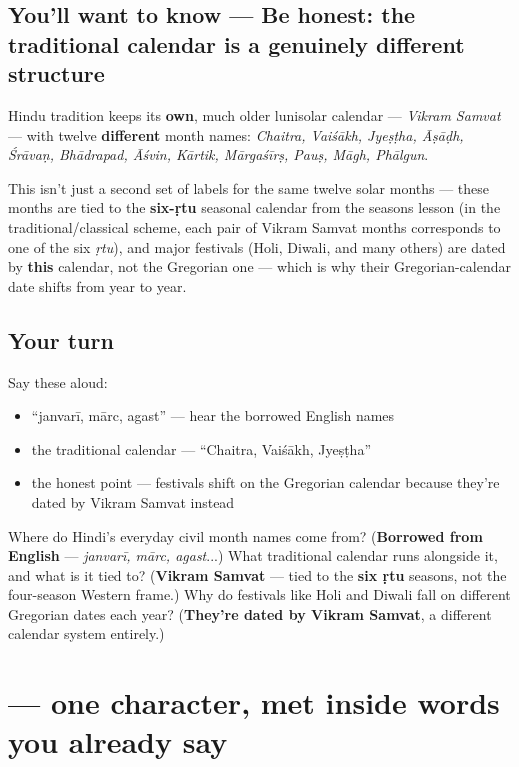 \subsection*{You'll want to know — Be honest: the traditional calendar is a genuinely different structure}
Hindu tradition keeps its \textbf{own}, much older lunisolar calendar — \emph{Vikram Samvat} — with twelve \textbf{different} month names: \emph{Chaitra, Vaiśākh, Jyeṣṭha, Āṣāḍh, Śrāvaṇ, Bhādrapad, Āśvin, Kārtik, Mārgaśīrṣ, Pauṣ, Māgh, Phālgun}.

This isn't just a second set of labels for the same twelve solar months — these months are tied to the \textbf{six-ṛtu} seasonal calendar from the seasons lesson (in the traditional/classical scheme, each pair of Vikram Samvat months corresponds to one of the six \emph{ṛtu}), and major festivals (Holi, Diwali, and many others) are dated by \textbf{this} calendar, not the Gregorian one — which is why their Gregorian-calendar date shifts from year to year.

\subsection*{Your turn}
Say these aloud:

\begin{itemize}
\raggedright
  \item \textquotedblleft{}janvarī, mārc, agast\textquotedblright{} — hear the borrowed English names
  \item the traditional calendar — \textquotedblleft{}Chaitra, Vaiśākh, Jyeṣṭha\textquotedblright{}
  \item the honest point — festivals shift on the Gregorian calendar because they're dated by Vikram Samvat instead
\end{itemize}

\begin{tcolorbox}[breakable,colback=teal!4,colframe=teal!35!black,title={Before you move on}]
Where do Hindi's everyday civil month names come from? (\textbf{Borrowed from English} — \emph{janvarī, mārc, agast}...) What traditional calendar runs alongside it, and what is it tied to? (\textbf{Vikram Samvat} — tied to the \textbf{six ṛtu} seasons, not the four-season Western frame.) Why do festivals like Holi and Diwali fall on different Gregorian dates each year? (\textbf{They're dated by Vikram Samvat}, a different calendar system entirely.)
\end{tcolorbox}
\section[\texorpdfstring{\hi{ु} (u)}{ु (u)}]{ — one character, met inside words you already say}


